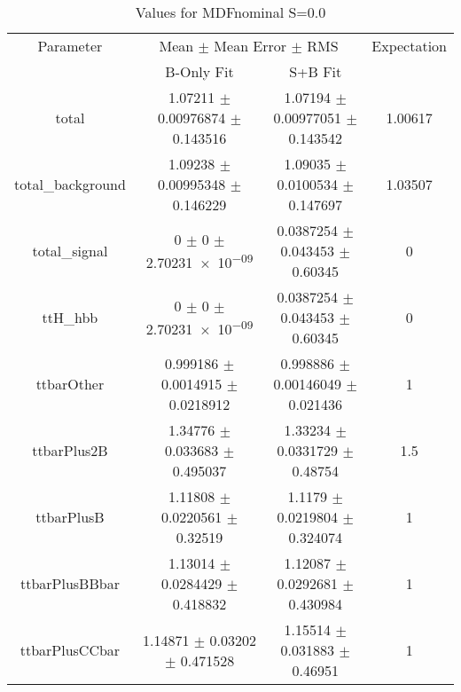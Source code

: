 \begin{table}
\centering
\caption{Values for MDFnominal S=0.0}
\begin{tabular}{cccc}
\toprule
Parameter & \multicolumn{2}{c}{Mean $\pm$ Mean Error $\pm$ RMS} & Expectation\\
 & B-Only Fit & S+B Fit & \\
\midrule
total & \num{1.07211} $\pm$ \num{0.00976874} $\pm$ \num{0.143516} & \num{1.07194} $\pm$ \num{0.00977051} $\pm$ \num{0.143542} & \num{1.00617}\\
total\_background & \num{1.09238} $\pm$ \num{0.00995348} $\pm$ \num{0.146229} & \num{1.09035} $\pm$ \num{0.0100534} $\pm$ \num{0.147697} & \num{1.03507}\\
total\_signal & \num{0} $\pm$ \num{0} $\pm$ \num{2.70231e-09} & \num{0.0387254} $\pm$ \num{0.043453} $\pm$ \num{0.60345} & \num{0}\\
ttH\_hbb & \num{0} $\pm$ \num{0} $\pm$ \num{2.70231e-09} & \num{0.0387254} $\pm$ \num{0.043453} $\pm$ \num{0.60345} & \num{0}\\
ttbarOther & \num{0.999186} $\pm$ \num{0.0014915} $\pm$ \num{0.0218912} & \num{0.998886} $\pm$ \num{0.00146049} $\pm$ \num{0.021436} & \num{1}\\
ttbarPlus2B & \num{1.34776} $\pm$ \num{0.033683} $\pm$ \num{0.495037} & \num{1.33234} $\pm$ \num{0.0331729} $\pm$ \num{0.48754} & \num{1.5}\\
ttbarPlusB & \num{1.11808} $\pm$ \num{0.0220561} $\pm$ \num{0.32519} & \num{1.1179} $\pm$ \num{0.0219804} $\pm$ \num{0.324074} & \num{1}\\
ttbarPlusBBbar & \num{1.13014} $\pm$ \num{0.0284429} $\pm$ \num{0.418832} & \num{1.12087} $\pm$ \num{0.0292681} $\pm$ \num{0.430984} & \num{1}\\
ttbarPlusCCbar & \num{1.14871} $\pm$ \num{0.03202} $\pm$ \num{0.471528} & \num{1.15514} $\pm$ \num{0.031883} $\pm$ \num{0.46951} & \num{1}\\
\bottomrule
\end{tabular}
\end{table}